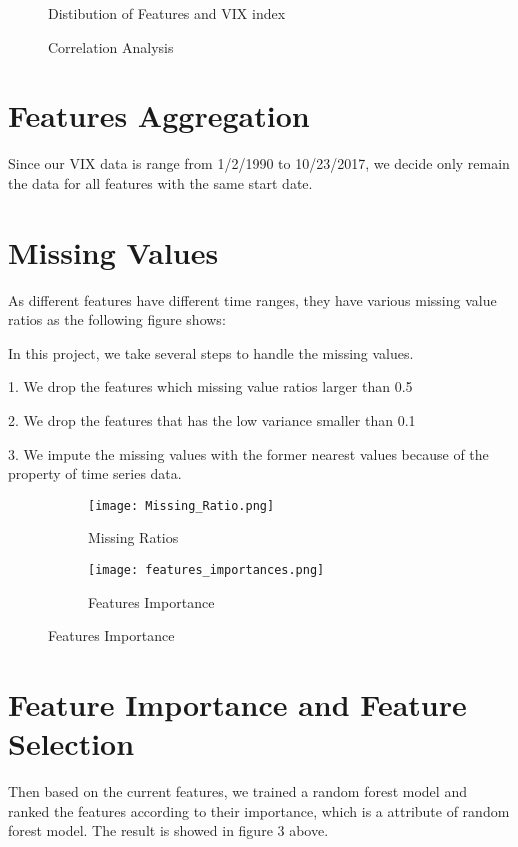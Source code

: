 \documentclass{article}
\begin{document}
\begin{figure}[]
\centering
{}
\caption{Distibution of Features and VIX index}
\end{figure}

\begin{figure}{}
\begin{center}
\caption{Correlation Analysis}
\end{center}
\end{figure}

\section*{Features Aggregation}
Since our VIX data is range from 1/2/1990 to 10/23/2017, we decide only remain the data for all features with the same start date.

\section*{Missing Values}
As different features have different time ranges, they have various missing value ratios as the following figure shows:

In this project, we take several steps to handle the missing values. 

1. We drop the features which missing value ratios larger than 0.5

2. We drop the features that has the low variance smaller than 0.1

3. We impute the missing values with the former nearest values because of the property of time series data. 

\begin{figure}{}
\centering
\begin{subfigure}{.5\textwidth}
  \centering
  \texttt{[image: Missing\_Ratio.png]}
  \caption{Missing Ratios}
  \label{fig:sub1}
\end{subfigure}%
\begin{subfigure}{.5\textwidth}
  \centering
  \texttt{[image: features\_importances.png]}
  \caption{Features Importance}
  \label{fig:sub2}
\end{subfigure}
\label{fig:test}
\end{figure}

\section*{Feature Importance and Feature Selection}
Then based on the current features, we trained a random forest model and ranked the features according to their importance, which is a attribute of random forest model. The result is showed in figure 3 above. 
\end{document}
